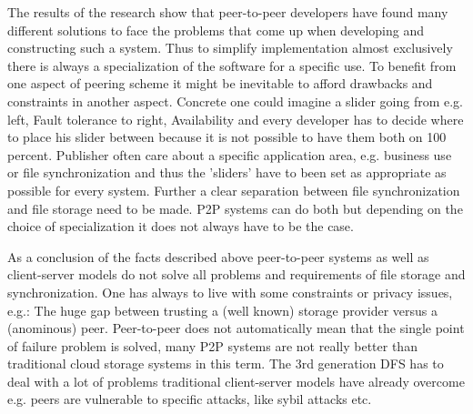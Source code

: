The results of the research show that peer-to-peer developers have found many different solutions to face the problems that come up when developing and constructing such a system. Thus to simplify implementation almost exclusively there is always a specialization of the software for a specific use. To benefit from one aspect of peering scheme it might be inevitable to afford drawbacks and constraints in another aspect. Concrete one could imagine a slider going from e.g. left, Fault tolerance to right, Availability and every developer has to decide where to place his slider between because it is not possible to have them both on 100 percent. Publisher often care about a specific application area, e.g. business use or file synchronization and thus the 'sliders' have to been set as appropriate as possible for every system. Further a clear separation between file synchronization and file storage need to be made. P2P systems can do both but depending on the choice of specialization it does not always have to be the case.

As a conclusion of the facts described above peer-to-peer systems as well as client-server models do not solve all problems and requirements of file storage and synchronization. One has always to live with some constraints or privacy issues, e.g.: The huge gap between trusting a (well known) storage provider versus a (anominous) peer. Peer-to-peer does not automatically mean that the single point of failure problem is solved, many P2P systems are not really better than traditional cloud storage systems in this term. The 3rd generation DFS has to deal with a lot of problems traditional client-server models have already overcome e.g. peers are vulnerable to specific attacks, like sybil attacks etc.

